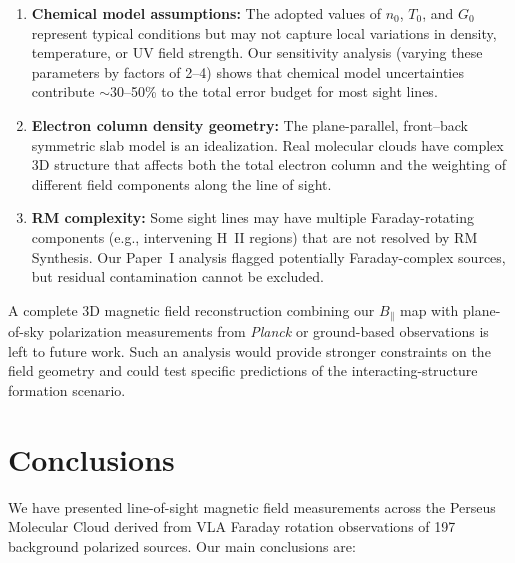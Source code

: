 \documentclass[twocolumn]{aastex701}
\begin{document}
\begin{enumerate}
    \item \textbf{Chemical model assumptions:} The adopted values of $n_0$, $T_0$, and $G_0$ represent typical conditions but may not capture local variations in density, temperature, or UV field strength. Our sensitivity analysis (varying these parameters by factors of 2--4) shows that chemical model uncertainties contribute $\sim 30$--50\% to the total error budget for most sight lines.

    \item \textbf{Electron column density geometry:} The plane-parallel, front--back symmetric slab model is an idealization. Real molecular clouds have complex 3D structure that affects both the total electron column and the weighting of different field components along the line of sight.

    \item \textbf{RM complexity:} Some sight lines may have multiple Faraday-rotating components (e.g., intervening H~II regions) that are not resolved by RM Synthesis. Our Paper~I analysis flagged potentially Faraday-complex sources, but residual contamination cannot be excluded.
\end{enumerate}

A complete 3D magnetic field reconstruction combining our $B_\parallel$ map with plane-of-sky polarization measurements from \textit{Planck} or ground-based observations is left to future work. Such an analysis would provide stronger constraints on the field geometry and could test specific predictions of the interacting-structure formation scenario.

\section{Conclusions}
\label{sec:conclusions}

We have presented line-of-sight magnetic field measurements across the Perseus Molecular Cloud derived from VLA Faraday rotation observations of 197 background polarized sources. Our main conclusions are:
\end{document}
